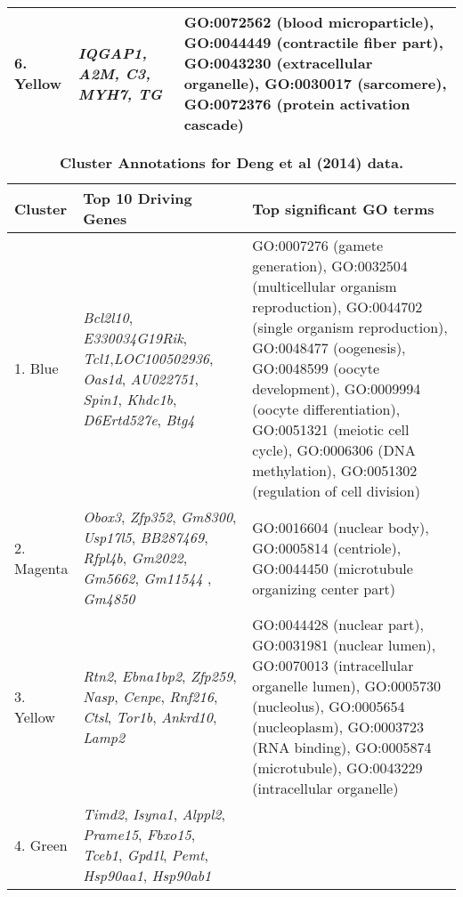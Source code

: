 \begin{table}[!hp]
\begin{adjustwidth}{-.50in}{0in}
\begin{tabular}{|p{1.0in}|p{1.5in}|p{4.3in}|}
\hline	
6. Yellow & \textit{IQGAP1, A2M, C3, MYH7, TG} & GO:0072562 (blood microparticle), GO:0044449 (contractile fiber part), GO:0043230 (extracellular organelle), GO:0030017 (sarcomere), GO:0072376 (protein activation cascade) \\
\hline
\end{tabular} \label{tab:tab2}
\end{adjustwidth}
 \end{table}


\begin{table}[!hp]
\begin{adjustwidth}{-.50in}{0in} %
\footnotesize
\centering
\caption{\bf Cluster Annotations for Deng et al (2014) data.}
\renewcommand{\arraystretch}{1.7}
\begin{tabular}{|p{1.0in}|p{1.5in}|p{4.3in}|}
\hline
Cluster & Top 10 Driving \qquad Genes &  Top significant GO terms \\
\hline
1. Blue & \textit{Bcl2l10}, \textit{E330034G19Rik}, \textit{Tcl1},\textit{LOC100502936}, \textit{Oas1d}, \textit{AU022751}, \textit{Spin1}, \textit{Khdc1b}, \textit{D6Ertd527e}, \textit{Btg4} & GO:0007276 (gamete generation), GO:0032504 (multicellular organism reproduction), GO:0044702 (single organism reproduction), GO:0048477 (oogenesis), GO:0048599 (oocyte development), GO:0009994 (oocyte differentiation), GO:0051321 (meiotic cell cycle), GO:0006306 (DNA methylation), GO:0051302 (regulation of cell division)\\
\hline
2. Magenta & \textit{Obox3}, \textit{Zfp352}, \textit{Gm8300}, \textit{Usp17l5}, \textit{BB287469}, \textit{Rfpl4b}, \textit{Gm2022}, \textit{Gm5662}, \textit{Gm11544 }, \textit{Gm4850}
& GO:0016604 (nuclear body), GO:0005814 (centriole), GO:0044450 (microtubule organizing center part) \\ 			
\hline
3. Yellow & \textit{Rtn2}, \textit{Ebna1bp2}, \textit{Zfp259}, \textit{Nasp}, \textit{Cenpe}, \textit{Rnf216}, \textit{Ctsl}, \textit{Tor1b}, \textit{Ankrd10}, \textit{Lamp2} & GO:0044428 (nuclear part), GO:0031981 (nuclear lumen), GO:0070013 (intracellular organelle lumen), GO:0005730 (nucleolus), GO:0005654 (nucleoplasm),  GO:0003723 (RNA binding), GO:0005874 (microtubule), GO:0043229 (intracellular organelle)\\
\hline
4. Green  
&  \textit{Timd2}, \textit{Isyna1}, \textit{Alppl2}, \textit{Prame15},  \textit{Fbxo15}, \textit{Tceb1}, \textit{Gpd1l}, \textit{Pemt}, \textit{Hsp90aa1}, \textit{Hsp90ab1}

\end{tabular}
\end{adjustwidth}
\end{table}
